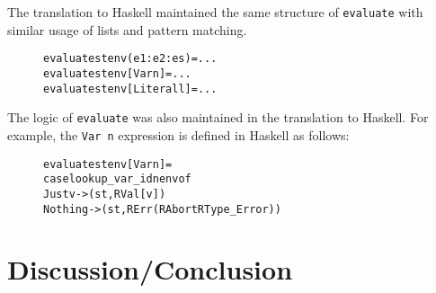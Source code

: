 The translation to Haskell maintained the same structure of \texttt{evaluate}
with similar usage of lists and pattern matching.

\begin{figure}[H]
\begin{alltt}
  evaluate st env (e1:e2:es)   = ...
  evaluate st env [Var n]      = ...
  evaluate st env [Literal l]  = ...
\end{alltt}
\end{figure}

\noindent The logic of \texttt{evaluate} was also maintained in the translation
to Haskell. For example, the \texttt{Var n} expression is defined in Haskell as
follows:

\begin{figure}[H]
\begin{alltt}
  evaluate st env [Var n] =
    case lookup_var_id n env of
      Just v  -> (st, RVal [v])
      Nothing -> (st, RErr (RAbort RType_Error))
\end{alltt}
\end{figure}


\section{Discussion/Conclusion}
